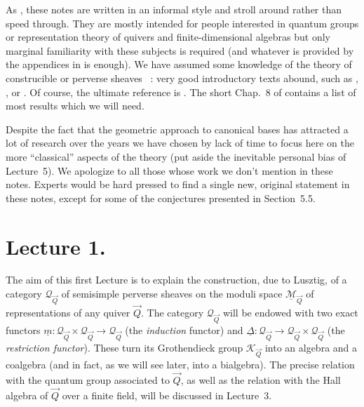\documentclass[a4paper,10pt]{amsart}
\numberwithin{equation}{section}
\begin{document}
\vspace{.1in}

As \cite{Trieste}, these notes are written in an informal style and stroll around rather than speed through. They are mostly intended for people interested in quantum groups or representation theory of quivers and finite-dimensional algebras but only marginal familiarity with these subjects is required (and whatever is provided by the appendices in \cite{Trieste} is enough). We have assumed some knowledge of the theory of construcible or perverse sheaves ~: very good introductory texts abound, such as \cite{Massey}, \cite{Achar}, \cite{Rietsch} or \cite{BorelDmod}. Of course, the ultimate reference is \cite{BBD}. The short Chap.~8 of \cite{Lusbook} contains a list of most results which we will need.

 
\vspace{.1in}

Despite the fact that the geometric approach to canonical bases has attracted a lot of research over the years we have chosen by lack of time to focus here on the more ``classical'' aspects of the theory
(put aside the inevitable personal bias of Lecture~5). We apologize to all those whose work we don't mention in these notes.
Experts would be hard pressed to find a single new, original statement in these notes, except for some of the conjectures presented in Section~5.5.

\vspace{.2in}

\newpage

\section{Lecture 1.}

\setcounter{section}{1}


\vspace{.2in}

The aim of this first Lecture is to explain the construction, due to Lusztig, of a category $\mathcal{Q}_{\vec{Q}}$ of semisimple perverse sheaves on the moduli space $\underline{\mathcal{M}}_{\vec{Q}}$ of representations of any quiver $\vec{Q}$.
The category $\mathcal{Q}_{\vec{Q}}$ will be endowed with two exact functors
$\underline{m}:  \mathcal{Q}_{\vec{Q}} \times \mathcal{Q}_{\vec{Q}} \to \mathcal{Q}_{\vec{Q}}$ (the \textit{induction} functor) and
$\underline{\Delta}: \mathcal{Q}_{\vec{Q}} \to \mathcal{Q}_{\vec{Q}} \times \mathcal{Q}_{\vec{Q}}$ (the \textit{restriction functor}). These turn its Grothendieck group $\mathcal{K}_{\vec{Q}}$ into an algebra and a coalgebra (and in fact, as we will see later, into a bialgebra). The precise relation with the quantum group associated to $\vec{Q}$, as well as the relation with the Hall algebra of $\vec{Q}$ over a finite field, will be discussed in Lecture~3.
\end{document}

